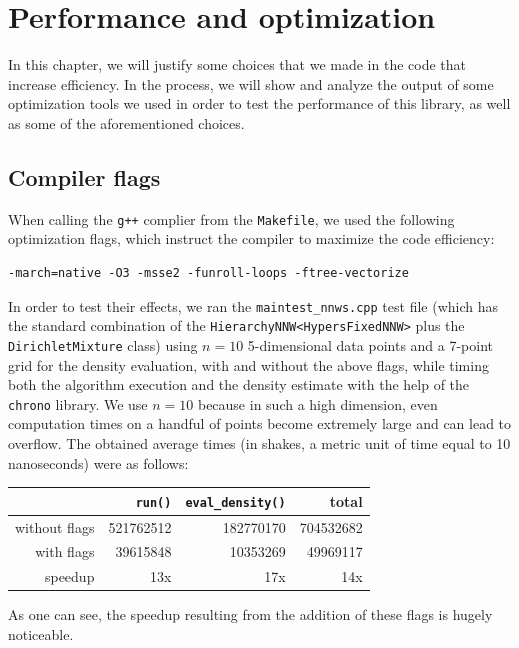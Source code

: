 \chapter{Performance and optimization}
In this chapter, we will justify some choices that we made in the code that increase efficiency.
In the process, we will show and analyze the output of some optimization tools we used in order to test the performance of this library, as well as some of the aforementioned choices.

\section{Compiler flags} \label{opt-flags}
When calling the \verb|g++| complier from the \verb|Makefile|, we used the following optimization flags, which instruct the compiler to maximize the code efficiency:
\begin{verbatim}
-march=native -O3 -msse2 -funroll-loops -ftree-vectorize
\end{verbatim}
In order to test their effects, we ran the \verb|maintest_nnws.cpp| test file (which has the standard combination of the \verb|HierarchyNNW<HypersFixedNNW>| plus the \verb|DirichletMixture| class) using $n=10$ 5-dimensional data points and a 7-point grid for the density evaluation, with and without the above flags, while timing both the algorithm execution and the density estimate with the help of the \verb|chrono| library.
We use $n=10$ because in such a high dimension, even computation times on a handful of points become extremely large and can lead to overflow.
The obtained average times (in shakes, a metric unit of time equal to 10 nanoseconds) were as follows:
\begin{center}
	\begin{tabular}{r|r|r|r}
	              	& \verb|run()| & \verb|eval_density()| & total \\ \hline
		without flags & 521762512 & 182770170 & 704532682 \\
		with flags    &  39615848 &  10353269 &  49969117 \\
		speedup       &       13x &       17x &       14x
	\end{tabular}
\end{center}
As one can see, the speedup resulting from the addition of these flags is hugely noticeable.


